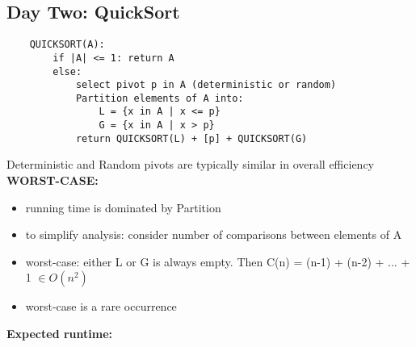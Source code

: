 \documentclass{article}
\begin{document}
	\subsection{Day Two: QuickSort\\}
	\begin{lstlisting}
	QUICKSORT(A):
		if |A| <= 1: return A
		else:
			select pivot p in A (deterministic or random)
			Partition elements of A into:
				L = {x in A | x <= p}
				G = {x in A | x > p}
			return QUICKSORT(L) + [p] + QUICKSORT(G)
	\end{lstlisting}
	Deterministic and Random pivots are typically similar in overall efficiency\\
	\textbf{WORST-CASE: }
	\begin{itemize}
		\item running time is dominated by Partition
		\item to simplify analysis: consider number of comparisons between elements of A
		\item worst-case: either L or G is always empty. Then C(n) = (n-1) + (n-2) + ... + 1 $\in O(n^2)$
		\item worst-case is a rare occurrence
	\end{itemize}
	\textbf{Expected runtime:}
\end{document}
